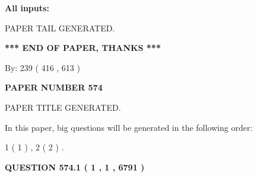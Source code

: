 \documentclass{ctexart}
\begin{document}
   
   
   
\noindent{}
   
   
   
   
\noindent\vspace{0.1in}\hspace{-0.08in} {\textbf{\Large{All inputs: }}}
   
   
   
   
   
   
 \vspace{0.2in}
 
   
   
\vspace{2.0in} PAPER TAIL GENERATED.
   
   
   
   
\vspace{1.0in} 
{\textbf{\large{ *** END OF PAPER, THANKS *** }}} 
   
   
\hspace{1.0in} By: 
 239 ( 416 ,  613 )
   
   
   
   
\newpage 
\setcounter{page}{ 
   574001 } 
   
   
   
   
 {\textbf{ \Large{ PAPER NUMBER  574  }}}
   
   
\vspace{0.2in}
   
   
   
   
   
   
   
   
 \vspace{0.2in}
 
 
 
 
   
   
 PAPER TITLE GENERATED.
   
   
   
\vspace{0.2in}
   
In this paper, big questions will be generated in the following order: 
   
   
   1 ( 1 )
 ,
   2 ( 2 )
 .
  
\vspace{0.2in}
  
{\textbf{\Large{QUESTION
574.1 
 ( 1 , 1 , 6791 )
}}}
  
\end{document}

